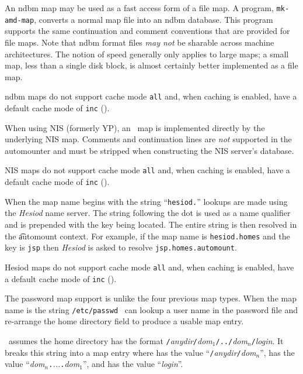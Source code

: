 \label{ndbm-maps}
An ndbm map may be used as a fast access form of a file map.
A program, {\tt mk-amd-map}, converts a normal map file into
an ndbm database.  This program supports the same continuation and
comment conventions that are provided for file maps.
Note that ndbm format files {\em may not} be
sharable across machine architectures.
The notion of speed generally only applies to large maps;
a small map, less than a single disk block, is almost certainly
better implemented as a file map.

ndbm maps do not support cache mode {\tt all} and, when
caching is enabled, have a default cache mode of {\tt inc} (\see {}).

When using NIS (formerly YP), an \amd\ map is implemented directly by the
underlying NIS map.
Comments and continuation lines are {\em not} supported
in the automounter and must be stripped when constructing the NIS server's database.

NIS maps do not support cache mode {\tt all} and,
when caching is enabled,
have a default cache mode of {\tt inc} (\see {}).

When the map name begins with the string ``{\tt hesiod.}'' lookups
are made using the {\em Hesiod} name server.  The string following
the dot is used as a name qualifier and is prepended with
the key being located.  The entire string is then resolved in the
{\t automount} context.  For example, if the map name is {\tt hesiod.homes}
and the key is {\tt jsp} then {\em Hesiod} is asked to resolve
{\tt jsp.homes.automount}.

Hesiod maps do not support cache mode {\tt all} and, when
caching is enabled, have a default cache mode of {\tt inc} (\see {}).

\label{map:passwd}
The password map support is unlike the four previous map types.
When the map name is the string {\tt /etc/passwd} 
\amd\ can lookup a user name in the password file and re-arrange
the home directory field to produce a usable map entry.

\Amd\ assumes the home directory has the format
{\tt /}{\em anydir}{\tt /}{\em dom$_1$}{\tt /../}{\em dom$_n$}{\tt /}{\em login}.
It breaks this string into a map entry where
 has the value ``{\tt /}{\em anydir}{\tt /}{\em dom$_n$}'',
 has the value ``{\em dom$_n$}{\tt .}{\em ...}{\tt .}{\em dom$_1$}'',
and  has the value ``{\em login}''.

